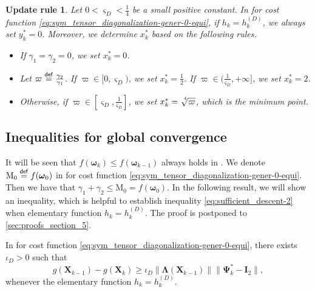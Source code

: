 \documentclass[final,onefignum,onetabnum]{siamart190516}
\newcommand{\matr}[1]{\boldsymbol{#1}}
\newcommand{\eqdef}{\stackrel{\sf def}{=}}
\newcommand{\Utwo}{\Psi}
\newtheorem{setting}[theorem]{Update rule}
\begin{document}
\begin{setting}\label{remar:rho_setting_four_case_c}
Let $0<\varsigma_{D}<\frac{1}{4}$ be a small positive constant.
In  for cost function \cref{eq:sym_tensor_diagonalization-gener-0-equi},
if $h_k=h^{(D)}_{k}$, we always set $y_k^{*}=0$.
Moreover, we determine $x_k^{*}$ based on the following rules.
\begin{itemize}
\item 
If $\gamma_{1}=\gamma_{2} = 0$, we set $x_k^{*}=0$.\\
\item 
Let $\varpi\eqdef\frac{\gamma_{2}}{\gamma_{1}}$. If $\varpi\in[0,\varsigma_{D})$, we set $x_k^{*}=\frac{1}{2}$.
If $\varpi\in(\frac{1}{\varsigma_{D}},+\infty]$, we set $x_k^{*}=2$.\\
\item 
Otherwise, if $\varpi\in[\varsigma_{D},\frac{1}{\varsigma_{D}}]$, we set $x_k^{*}=\sqrt[\leftroot{-2}\uproot{4}4]{\varpi}$,
which is the minimum point.
\end{itemize}
\end{setting}

\subsection{Inequalities for global convergence}
It will be seen that $f(\matr{\omega}_{k})\leq f(\matr{\omega}_{k-1})$ always holds in .
We denote $\mathrm{M}_0\eqdef f(\matr{\omega}_0)$ in  for cost function \cref{eq:sym_tensor_diagonalization-gener-0-equi}. 
Then we have that $\gamma_{1}+\gamma_{2}\leq\mathrm{M}_0=f(\matr{\omega}_0)$. 
In the following result, we will show an inequality, which is helpful to establish inequality \cref{eq:sufficient_descent-2} when elementary function $h_k=h^{(D)}_{k}$. 
The proof is postponed to
\cref{sec:proofs_section_5}. 


\begin{lemma}\label{lemma:global_rho_c-0}
In  for cost function \cref{eq:sym_tensor_diagonalization-gener-0-equi},
there exists $\iota_{D}>0$ such that 
\begin{equation}\label{equation-condition-weak_c-5}
g(\matr{X}_{k-1})-g(\matr{X}_{k})\geq\iota_{D}\|\matr{\Lambda}(\matr{X}_{k-1})\|\|\matr{\Utwo}^{*}_{k}-\matr{I}_{2}\|,
\end{equation}
whenever the elementary function $h_k=h^{(D)}_{k}$. 	
\end{lemma}
\end{document}
